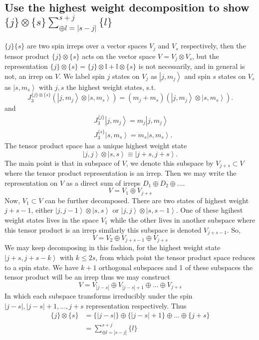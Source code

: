 \documentclass[main.tex]{subfiles}
\begin{document}
\subsection{Use the highest weight decomposition to show $\{j\}\otimes\{s\}\sum_{\oplus l=|s-j|}^{s+j}\{l\}$}
$\{j\}\{s\}$ are two spin irreps over a vector spaces $V_j$ and $V_s$ respectively, then the tensor product $\{j\}\otimes\{s\}$ acts on the vector space $V=V_j\otimes V_s$, but the representation $\{j\}\otimes\{s\}=\{j\}\otimes\mathbb{I}+\mathbb{I}\otimes\{s\}$ is not necessarily, and in general is not, an irrep on $V$.
We label spin $j$ states on $V_j$ as $\left|j,m_j\right>$ and spin $s$ states on $V_s$ as $\left|s,m_s\right>$ with $j,s$ the highest weight states, s.t.
\begin{equation}
J_3^{\{j\}\otimes\{s\}}\left(\left|j,m_j\right>\otimes\left|s,m_s\right>\right)=(m_j+m_s)\left(\left|j,m_j\right>\otimes\left|s,m_s\right>\right).
\end{equation}
and
\begin{align}
&J_3^{\{j\}}\left|j,m_j\right>=m_j\left|j,m_j\right>\\
&J_3^{\{s\}}\left|s,m_s\right>=m_s\left|s,m_s\right>.
\end{align}
The tensor product space has a unique highest weight state
\begin{equation}
\left|j,j\right>\otimes\left|s,s\right>\equiv\left|j+s,j+s\right>.
\end{equation}
The main point is that in subspace of $V$, we denote this subspace by $V_{j+s}\subset V$ where the tensor product representation is an irrep. Then we may write the representation on $V$ as a direct sum of irreps $D_1\oplus D_2\oplus ...$.
\begin{equation}
V=V_1\oplus V_{j+s}
\end{equation}
Now, $V_1\subset V$ can be further decomposed. There are two states of highest weight $j+s-1$, either $\left|j,j-1\right>\otimes\left|s,s\right>$ or $\left|j,j\right>\otimes\left|s,s-1\right>$. One of these hgihest weight states lives in the space $V_1$ while the other lives in another subspace where this tensor product is an irrep similarly this subspace is denoted $V_{j+s-1}$. So,
\begin{equation}
V=V_2\oplus V_{j+s-1}\oplus V_{j+s}
\end{equation}
We may keep decomposing in this fashion, for the highest weight state $\left|j+s,j+s-k\right>$ with $k\leq2s$, from which point the tensor product space reduces to a spin state. We have $k+1$ orthogonal subspaces and 1 of these subspaces the tensor product will be an irrep thus we may construct
\begin{equation}
V=V_{|j-s|}\oplus V_{|j-s|+1}\oplus...\oplus V_{j+s}
\end{equation}
In which each subspace transforms irreducibly under the spin $|j-s|,|j-s|+1,...,j+s$ representation respectively. Thus
\begin{align}
\{j\}\otimes\{s\}&=\{|j-s|\}\oplus\{|j-s|+1\}\oplus...\oplus\{j+s\} \\
&=\sum_{\oplus l=|s-j|}^{s+j}{\{l\}}
\end{align}
%
\end{document}
